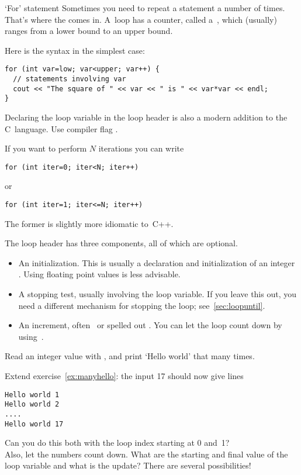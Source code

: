 \begin{slide}{`For' statement}
  \label{sl:for}
  Sometimes you need to repeat a statement a number of times. That's
  where the  comes in. A~loop has a counter, called
  a~, which (usually) ranges from a lower bound
  to an upper bound.

  Here is the syntax in the simplest case:
\begin{lstlisting}
for (int var=low; var<upper; var++) {
  // statements involving var
  cout << "The square of " << var << " is " << var*var << endl;
}
\end{lstlisting}
\end{slide}

\begin{remark}
  Declaring the loop variable in the loop header is also a modern
  addition to the C~language.
  Use compiler flag .
\end{remark}

If you want to perform $N$ iterations you can write
\begin{lstlisting}
for (int iter=0; iter<N; iter++)
\end{lstlisting}
or
\begin{lstlisting}
for (int iter=1; iter<=N; iter++)
\end{lstlisting}
The former is slightly more idiomatic to~C++.

The loop header has three components, all of which are optional.
\begin{itemize}
\item An initialization. This is usually a declaration and
  initialization of an integer . Using
  floating point values is less advisable.
\item A stopping test, usually
  involving the loop variable. If you leave this out, you need a
  different mechanism for stopping the loop; see~\ref{sec:loopuntil}.
\item An increment, often~ or spelled out . You can let the loop count down by using~.
\end{itemize}

\begin{exercise}
  \label{ex:manyhello}
  Read an integer value with , and print `Hello world' that many times.
\end{exercise}
\begin{exercise}
  \label{ex:counthello}
  Extend exercise~\ref{ex:manyhello}: the input 17 should now give lines
\begin{verbatim}
Hello world 1
Hello world 2
....
Hello world 17
\end{verbatim}
Can you do this both with the loop index starting at 0 and~1?\\
Also, let the numbers count down. What are the starting and final
value of the loop variable and what is the update? There are several possibilities!
\end{exercise}

